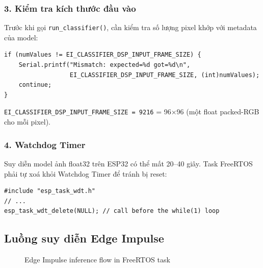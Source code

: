 \documentclass[12pt,a4paper]{article}
\begin{document}
\subsubsection*{3. Kiểm tra kích thước đầu vào}

Trước khi gọi \texttt{run\_classifier()}, cần kiểm tra số lượng pixel khớp với metadata của model:

\begin{lstlisting}[caption={Kiểm tra kích thước đầu vào}]
if (numValues != EI_CLASSIFIER_DSP_INPUT_FRAME_SIZE) {
    Serial.printf("Mismatch: expected=%d got=%d\n",
                  EI_CLASSIFIER_DSP_INPUT_FRAME_SIZE, (int)numValues);
    continue;
}
\end{lstlisting}

\texttt{EI\_CLASSIFIER\_DSP\_INPUT\_FRAME\_SIZE = 9216} = 96×96 (một float packed-RGB cho mỗi pixel).

\subsubsection*{4. Watchdog Timer}

Suy diễn model ảnh float32 trên ESP32 có thể mất 20--40 giây. Task FreeRTOS phải tự xoá khỏi Watchdog Timer để tránh bị reset:

\begin{lstlisting}[caption={Tắt Watchdog cho task suy diễn nặng}]
#include "esp_task_wdt.h"
// ...
esp_task_wdt_delete(NULL); // call before the while(1) loop
\end{lstlisting}

\subsection{Luồng suy diễn Edge Impulse}

\begin{figure}[H]
\centering
{}
\caption{Edge Impulse inference flow in FreeRTOS task}
\end{figure}
\end{document}
